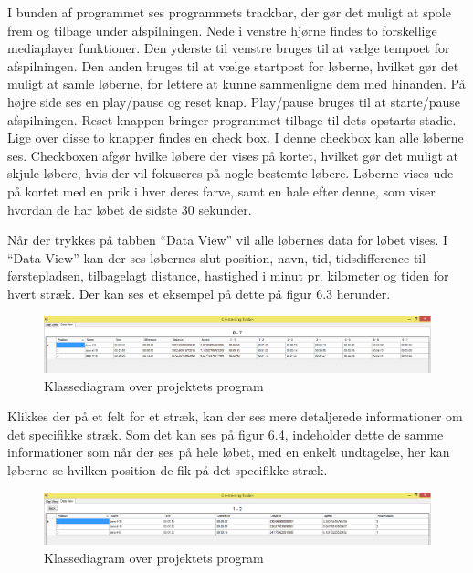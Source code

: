 I bunden af programmet ses programmets trackbar, der gør det muligt at spole frem og tilbage under afspilningen. Nede i venstre hjørne findes to forskellige mediaplayer funktioner. Den yderste til venstre bruges til at vælge tempoet for afspilningen. Den anden bruges til at vælge startpost for løberne, hvilket gør det muligt at samle løberne, for lettere at kunne sammenligne dem med hinanden. På højre side ses en play/pause og  reset knap. Play/pause bruges til at starte/pause afspilningen. Reset knappen bringer programmet tilbage til dets opstarts stadie. Lige over disse to knapper findes en check box. I denne checkbox kan alle løberne ses. Checkboxen afgør hvilke løbere der vises på kortet, hvilket gør det muligt at skjule løbere, hvis der vil fokuseres på nogle bestemte løbere. Løberne vises ude på kortet med en prik i hver deres farve, samt en hale efter denne, som viser hvordan de har løbet de sidste 30 sekunder. 

Når der trykkes på tabben “Data View” vil alle løbernes data for løbet vises. I “Data View” kan der ses løbernes slut position, navn, tid, tidsdifference til førstepladsen, tilbagelagt distance, hastighed i minut pr. kilometer og tiden for hvert stræk. Der kan ses et eksempel på dette på figur 6.3 herunder. 
\begin{figure} [h]
	\centering
	\includegraphics[width=1\textwidth]{billeder/DataView1}
	\caption{Klassediagram over projektets program}
\end{figure}

Klikkes der på et felt for et stræk, kan der ses mere detaljerede informationer om det specifikke stræk. Som det kan ses på figur 6.4, indeholder dette de samme informationer som når der ses på hele løbet, med en enkelt undtagelse, her kan løberne se hvilken position de fik på det specifikke stræk. 
\begin{figure} [h]
	\centering
	\includegraphics[width=1\textwidth]{billeder/DataView2}
	\caption{Klassediagram over projektets program}
\end{figure}


